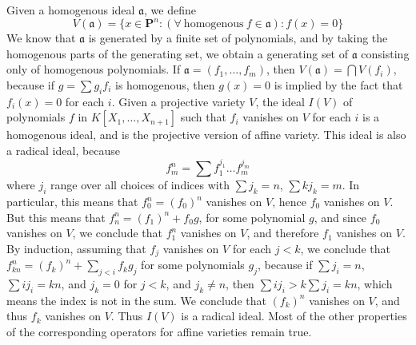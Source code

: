 Given a homogenous ideal $\mathfrak{a}$, we define
%
\[ V(\mathfrak{a}) = \{ x \in \mathbf{P}^n: (\forall\ \text{homogenous}\ f \in \mathfrak{a}): f(x) = 0 \} \]
%
We know that $\mathfrak{a}$ is generated by a finite set of polynomials, and by taking the homogenous parts of the generating set, we obtain a generating set of $\mathfrak{a}$ consisting only of homogenous polynomials. If $\mathfrak{a} = (f_1, \dots, f_m)$, then $V(\mathfrak{a}) = \bigcap V(f_i)$, because if $g = \sum g_i f_i$ is homogenous, then $g(x) = 0$ is implied by the fact that $f_i(x) = 0$ for each $i$. Given a projective variety $V$, the ideal $I(V)$ of polynomials $f$ in $K[X_1, \dots, X_{n+1}]$ such that $f_i$ vanishes on $V$ for each $i$ is a homogenous ideal, and is the projective version of affine variety. This ideal is also a radical ideal, because
%
\[ f^n_m = \sum f_1^{j_1} \dots f_m^{j_m} \]
%
where $j_i$ range over all choices of indices with $\sum j_k = n$, $\sum kj_k = m$. In particular, this means that $f^n_0 = (f_0)^n$ vanishes on $V$, hence $f_0$ vanishes on $V$. But this means that $f^n_n = (f_1)^n + f_0g$, for some polynomial $g$, and since $f_0$ vanishes on $V$, we conclude that $f_1^n$ vanishes on $V$, and therefore $f_1$ vanishes on $V$. By induction, assuming that $f_j$ vanishes on $V$ for each $j < k$, we conclude that $f^n_{kn} = (f_k)^n + \sum_{j < i} f_kg_j$ for some polynomials $g_j$, because if $\sum j_i = n$, $\sum ij_i = kn$, and $j_k = 0$ for $j < k$, and $j_k \neq n$, then $\sum ij_i > k\sum j_i = kn$, which means the index is not in the sum. We conclude that $(f_k)^n$ vanishes on $V$, and thus $f_k$ vanishes on $V$. Thus $I(V)$ is a radical ideal. Most of the other properties of the corresponding operators for affine varieties remain true.
%
